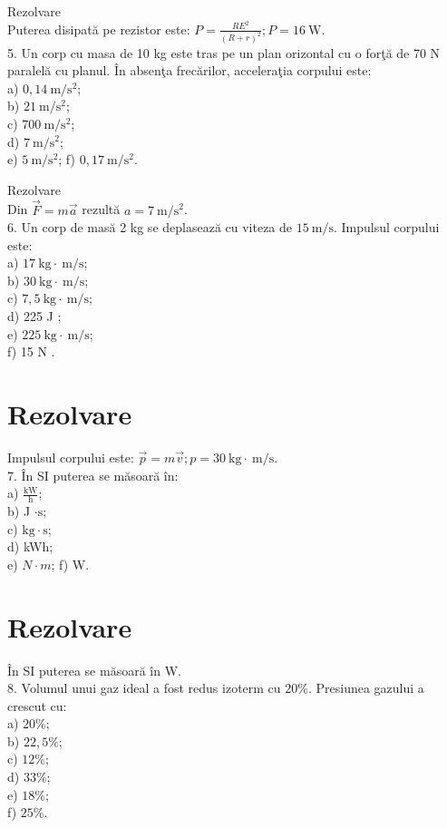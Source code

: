 Rezolvare\\
Puterea disipată pe rezistor este: $P=\frac{R E^{2}}{(R+r)^{2}} ; P=16 \mathrm{~W}$.\\
5. Un corp cu masa de 10 kg este tras pe un plan orizontal cu o forţă de 70 N paralelă cu planul. În absenţa frecărilor, acceleraţia corpului este:\\
a) $0,14 \mathrm{~m} / \mathrm{s}^{2}$;\\
b) $21 \mathrm{~m} / \mathrm{s}^{2}$;\\
c) $700 \mathrm{~m} / \mathrm{s}^{2}$;\\
d) $7 \mathrm{~m} / \mathrm{s}^{2}$;\\
e) $5 \mathrm{~m} / \mathrm{s}^{2}$; f) $0,17 \mathrm{~m} / \mathrm{s}^{2}$.

Rezolvare\\
Din $\vec{F}=m \vec{a}$ rezultă $a=7 \mathrm{~m} / \mathrm{s}^{2}$.\\
6. Un corp de masă 2 kg se deplasează cu viteza de $15 \mathrm{~m} / \mathrm{s}$. Impulsul corpului este:\\
a) $17 \mathrm{~kg} \cdot \mathrm{~m} / \mathrm{s}$;\\
b) $30 \mathrm{~kg} \cdot \mathrm{~m} / \mathrm{s}$;\\
c) $7,5 \mathrm{~kg} \cdot \mathrm{~m} / \mathrm{s}$;\\
d) 225 J ;\\
e) $225 \mathrm{~kg} \cdot \mathrm{~m} / \mathrm{s}$;\\
f) 15 N .

\section*{Rezolvare}
Impulsul corpului este: $\vec{p}=m \vec{v} ; p=30 \mathrm{~kg} \cdot \mathrm{~m} / \mathrm{s}$.\\
7. În SI puterea se măsoară în:\\
a) $\frac{\mathrm{kW}}{\mathrm{h}}$;\\
b) J $\cdot \mathrm{s}$;\\
c) $\mathrm{kg} \cdot \mathrm{s}$;\\
d) kWh;\\
e) $N \cdot m$; f) W.

\section*{Rezolvare}
În SI puterea se măsoară în W.\\
8. Volumul unui gaz ideal a fost redus izoterm cu $20 \%$. Presiunea gazului a crescut cu:\\
a) $20 \%$;\\
b) $22,5 \%$;\\
c) $12 \%$;\\
d) $33 \%$;\\
e) $18 \%$;\\
f) $25 \%$.


